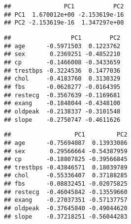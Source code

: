\documentclass[
]{article}
\newenvironment{Shaded}{\begin{snugshade}}{\end{snugshade}}
\newcommand{\CommentTok}[1]{\textcolor[rgb]{0.56,0.35,0.01}{\textit{#1}}}
\newcommand{\DecValTok}[1]{\textcolor[rgb]{0.00,0.00,0.81}{#1}}
\newcommand{\FunctionTok}[1]{\textcolor[rgb]{0.00,0.00,0.00}{#1}}
\newcommand{\NormalTok}[1]{#1}
\newcommand{\SpecialCharTok}[1]{\textcolor[rgb]{0.00,0.00,0.00}{#1}}
\begin{document}
\begin{Shaded}
\end{Shaded}

\begin{verbatim}
##               PC1           PC2
## PC1  1.670012e+00 -2.153619e-16
## PC2 -2.153619e-16  1.347297e+00
\end{verbatim}

\begin{Shaded}
\end{Shaded}

\begin{verbatim}
##                 PC1        PC2
## age      -0.5971503  0.1223762
## sex       0.2369251 -0.4852210
## cp       -0.1466008 -0.3433659
## trestbps -0.3224536  0.1477036
## chol     -0.4183760  0.3130329
## fbs      -0.0628277 -0.0164395
## restecg  -0.3567639 -0.1169681
## exang    -0.1848044 -0.4348100
## oldpeak  -0.2138337 -0.3101548
## slope    -0.2750747 -0.4611626
\end{verbatim}

\begin{Shaded}
\end{Shaded}

\begin{verbatim}
##                  PC1         PC2
## age      -0.75694087  0.13933086
## sex       0.29566664 -0.54387959
## cp       -0.18807825 -0.39566845
## trestbps -0.43846571  0.18039789
## chol     -0.55336407  0.37188285
## fbs      -0.08832451 -0.02075825
## restecg  -0.46045842 -0.13559660
## exang    -0.27037351 -0.57137757
## oldpeak  -0.37645840 -0.49044620
## slope    -0.37218251 -0.56044283
\end{verbatim}
\end{document}
